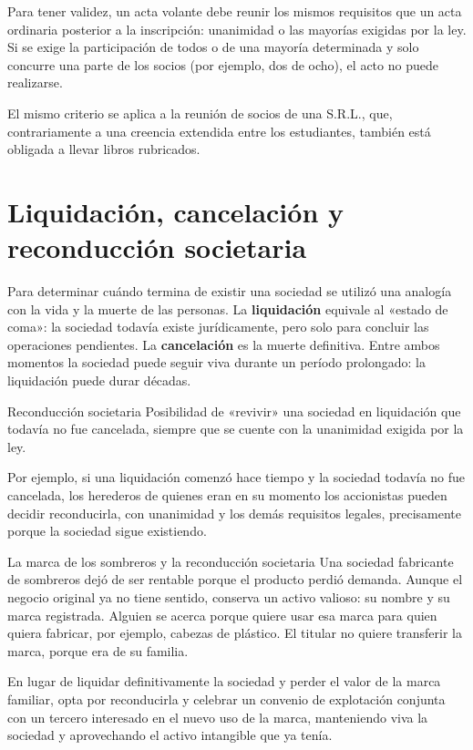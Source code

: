 \documentclass[12pt,oneside]{book}
\begin{document}
\begin{important}
Para tener validez, un acta volante debe reunir los mismos requisitos que un acta ordinaria posterior a la inscripción: unanimidad o las mayorías exigidas por la ley. Si se exige la participación de todos o de una mayoría determinada y solo concurre una parte de los socios (por ejemplo, dos de ocho), el acto no puede realizarse.
\end{important}

El mismo criterio se aplica a la reunión de socios de una S.R.L., que, contrariamente a una creencia extendida entre los estudiantes, también está obligada a llevar libros rubricados.

\section{Liquidación, cancelación y reconducción societaria}
\label{sec:reconduccion}

Para determinar cuándo termina de existir una sociedad se utilizó una analogía con la vida y la muerte de las personas. La \textbf{liquidación} equivale al «estado de coma»: la sociedad todavía existe jurídicamente, pero solo para concluir las operaciones pendientes. La \textbf{cancelación} es la muerte definitiva. Entre ambos momentos la sociedad puede seguir viva durante un período prolongado: la liquidación puede durar décadas.

\begin{definition}{Reconducción societaria}
Posibilidad de «revivir» una sociedad en liquidación que todavía no fue cancelada, siempre que se cuente con la unanimidad exigida por la ley.
\end{definition}

Por ejemplo, si una liquidación comenzó hace tiempo y la sociedad todavía no fue cancelada, los herederos de quienes eran en su momento los accionistas pueden decidir reconducirla, con unanimidad y los demás requisitos legales, precisamente porque la sociedad sigue existiendo.

\begin{example}{La marca de los sombreros y la reconducción societaria}
Una sociedad fabricante de sombreros dejó de ser rentable porque el producto perdió demanda. Aunque el negocio original ya no tiene sentido, conserva un activo valioso: su nombre y su marca registrada. Alguien se acerca porque quiere usar esa marca para quien quiera fabricar, por ejemplo, cabezas de plástico. El titular no quiere transferir la marca, porque era de su familia.

En lugar de liquidar definitivamente la sociedad y perder el valor de la marca familiar, opta por reconducirla y celebrar un convenio de explotación conjunta con un tercero interesado en el nuevo uso de la marca, manteniendo viva la sociedad y aprovechando el activo intangible que ya tenía.
\end{example}
\end{document}
